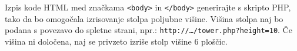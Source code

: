\documentclass[a4paper,12pt]{article}
\begin{document}
\noindent
Izpis kode HTML med značkama \texttt{<body>} in \texttt{</body>} generirajte s skripto PHP, tako da bo omogočala izrisovanje stolpa poljubne višine. Višina stolpa naj bo podana s povezavo do spletne strani, npr.: \texttt{http://\ldots/tower.php?height=10}. Če višina ni določena, naj se privzeto izriše stolp višine 6 ploščic.
\end{document}

